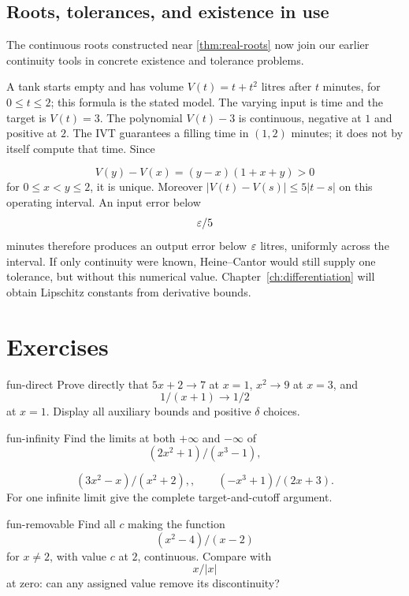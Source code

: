 \subsection*{Roots, tolerances, and existence in use}
The continuous roots constructed near \cref{thm:real-roots} now join
our earlier continuity tools in concrete existence and tolerance problems.

\begin{example}
A tank starts empty and has volume $V(t)=t+t^2$ litres after $t$
minutes, for $0\leq t\leq2$; this formula is the stated model.
The varying input is time and the target is $V(t)=3$.
The polynomial $V(t)-3$ is continuous, negative at $1$ and positive
at $2$. The IVT guarantees a filling time in $(1,2)$ minutes;
it does not by itself compute that time. Since

\[
V(y)-V(x)=(y-x)(1+x+y)>0
\]
 for $0\leq x<y\leq2$, it is unique.
Moreover $|V(t)-V(s)|\leq5|t-s|$ on this operating interval.
An input error below
\[
\varepsilon/5
\]
 minutes therefore produces an output
error below $\varepsilon$ litres, uniformly across the interval. If only
continuity were known, Heine--Cantor would still supply one tolerance,
but without this numerical value. Chapter~\ref{ch:differentiation}
will obtain Lipschitz constants from derivative bounds.
\end{example}

\section*{Exercises}

\begin{hexercise}{fun-direct}
Prove directly that $5x+2\to7$ at $x=1$, $x^2\to9$ at $x=3$, and
\[
1/(x+1)\to1/2
\]
 at $x=1$. Display all auxiliary bounds and positive $\delta$ choices.
\end{hexercise}

\begin{hexercise}{fun-infinity}
Find the limits at both $+\infty$ and $-\infty$ of
\[
(2x^2+1)/(x^3-1),
\]

\[
(3x^2-x)/(x^2+2),,\qquad (-x^3+1)/(2x+3).
\]
 For one infinite limit give the complete target-and-cutoff argument.
\end{hexercise}

\begin{hexercise}{fun-removable}
Find all $c$ making the function
\[
(x^2-4)/(x-2)
\]
 for $x\ne2$, with value $c$ at $2$, continuous. Compare with
\[
x/|x|
\]
 at zero: can any assigned value remove its discontinuity?
\end{hexercise}

